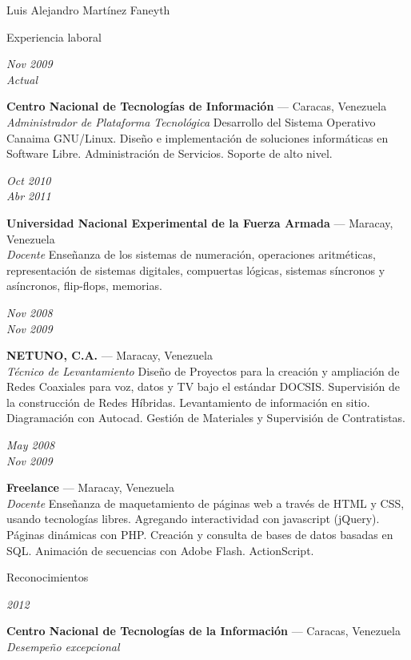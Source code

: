 \documentclass[letterpaper]{scrartcl}
\begin{document}
\begin{cv}{Luis Alejandro Mart\'inez Faneyth}
\begin{cvlist}{Experiencia laboral}
\item[{\parbox[t]{6em}{\textit{\large{Nov 2009\\Actual}}}}]{
	\parbox[t]{\linewidth}{
		\textbf{Centro Nacional de Tecnolog\'ias de Informaci\'on} --- Caracas, Venezuela\\
		\textit{Administrador de Plataforma Tecnol\'ogica}
		\footnotesize{Desarrollo del Sistema Operativo Canaima GNU/Linux. Dise\~no e implementaci\'on de soluciones inform\'aticas en Software Libre. Administración de Servicios. Soporte de alto nivel.}
	}
}
\item[{\parbox[t]{6em}{\textit{\large{Oct 2010\\Abr 2011}}}}]{
	\parbox[t]{\linewidth}{
		\textbf{Universidad Nacional Experimental de la Fuerza Armada} --- Maracay, Venezuela\\
		\textit{Docente}
		\footnotesize{Enseñanza de los sistemas de numeración, operaciones aritméticas, representación de sistemas digitales, compuertas lógicas, sistemas síncronos y asíncronos, flip-flops, memorias.}
	}
}
\item[{\parbox[t]{6em}{\textit{\large{Nov 2008\\Nov 2009}}}}]{
	\parbox[t]{\linewidth}{
		\textbf{NETUNO, C.A.} --- Maracay, Venezuela\\
		\textit{Técnico de Levantamiento}
		\footnotesize{Diseño de Proyectos para la creación y ampliación de Redes Coaxiales para voz, datos y TV bajo el estándar DOCSIS. Supervisión de la construcción de Redes Híbridas. Levantamiento de información en sitio. Diagramación con Autocad. Gestión de Materiales y Supervisión de Contratistas.}
	}
}
\item[{\parbox[t]{6em}{\textit{\large{May 2008\\Nov 2009}}}}]{
	\parbox[t]{\linewidth}{
		\textbf{Freelance} --- Maracay, Venezuela\\
		\textit{Docente}
		\footnotesize{Enseñanza de maquetamiento de páginas web a través de HTML y CSS, usando tecnologías libres. Agregando interactividad con javascript (jQuery). Páginas dinámicas con PHP. Creación y consulta de bases de datos basadas en SQL. Animación de secuencias con Adobe Flash. ActionScript.}
	}
}
\end{cvlist}

\begin{cvlist}{Reconocimientos}
\item[{\parbox[t]{6em}{\textit{\large{2012}}}}]{
	\parbox[t]{\linewidth}{
		\textbf{Centro Nacional de Tecnolog\'ias de la Informaci\'on} --- Caracas, Venezuela\\
		\textit{Desempeño excepcional}
	}
}
\end{cvlist}


\end{cv}
\end{document}
